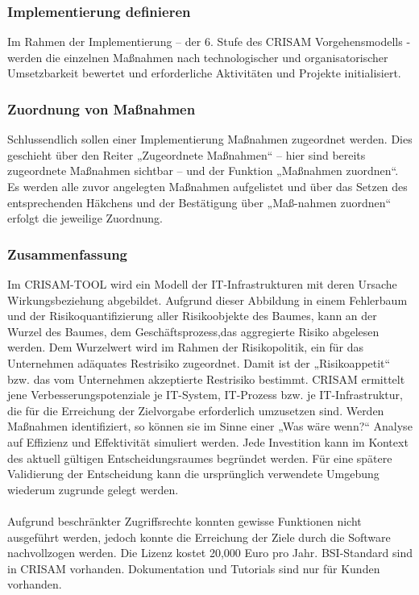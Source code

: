 \subsubsection{Implementierung definieren}
Im Rahmen der Implementierung – der 6. Stufe des CRISAM Vorgehensmodells - werden die einzelnen Maßnahmen nach technologischer und organisatorischer Umsetzbarkeit bewertet und erforderliche Aktivitäten und Projekte initialisiert.
\subsubsection{Zuordnung von Maßnahmen}
Schlussendlich sollen einer Implementierung Maßnahmen zugeordnet werden. Dies geschieht über den Reiter „Zugeordnete Maßnahmen“ – hier sind bereits zugeordnete Maßnahmen sichtbar – und der Funktion „Maßnahmen zuordnen“. Es werden alle zuvor angelegten Maßnahmen aufgelistet und über das Setzen des entsprechenden Häkchens und der Bestätigung über „Maß-nahmen zuordnen“ erfolgt die jeweilige Zuordnung.
\subsubsection{Zusammenfassung}
Im CRISAM-TOOL wird ein Modell der IT-Infrastrukturen mit deren Ursache Wirkungsbeziehung abgebildet. Aufgrund dieser Abbildung in einem Fehlerbaum und der Risikoquantifizierung aller Risikoobjekte des Baumes, kann an der Wurzel des Baumes, dem Geschäftsprozess,das aggregierte Risiko abgelesen werden. Dem Wurzelwert wird im Rahmen der Risikopolitik, ein für das Unternehmen adäquates Restrisiko zugeordnet. Damit ist der „Risikoappetit“ bzw. das vom Unternehmen akzeptierte Restrisiko bestimmt.
CRISAM ermittelt jene Verbesserungspotenziale je IT-System, IT-Prozess bzw. je IT-Infrastruktur,
die für die Erreichung der Zielvorgabe erforderlich umzusetzen sind.
Werden Maßnahmen identifiziert, so können sie im Sinne einer „Was wäre wenn?“ Analyse auf Effizienz und Effektivität simuliert werden. Jede Investition kann im Kontext des aktuell gültigen Entscheidungsraumes begründet werden. Für eine spätere Validierung der Entscheidung kann die ursprünglich verwendete Umgebung wiederum zugrunde gelegt werden.
\\
\\
Aufgrund beschränkter Zugriffsrechte konnten gewisse Funktionen nicht ausgeführt werden, jedoch konnte die Erreichung der Ziele durch die Software nachvollzogen werden.
Die Lizenz kostet 20,000 Euro pro Jahr. BSI-Standard sind in CRISAM vorhanden. Dokumentation und Tutorials sind nur für Kunden vorhanden. 
